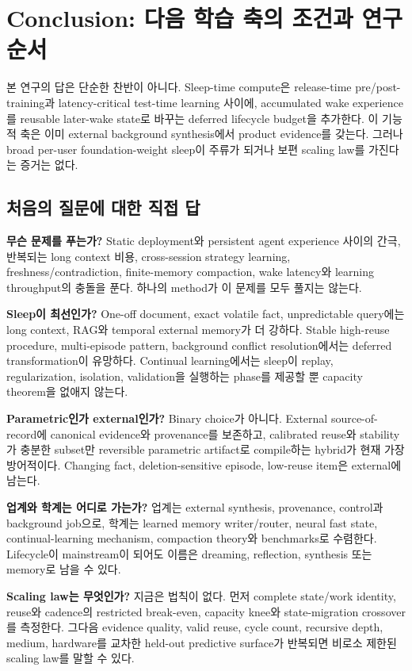 \chapter{Conclusion: 다음 학습 축의 조건과 연구 순서}
\label{STC-S17}

본 연구의 답은 단순한 찬반이 아니다. Sleep-time compute은 release-time pre/post-training과
latency-critical test-time learning 사이에, accumulated wake experience를 reusable later-wake state로
바꾸는 deferred lifecycle budget을 추가한다. 이 기능적 축은 이미 external background synthesis에서
product evidence를 갖는다. 그러나 broad per-user foundation-weight sleep이 주류가 되거나 보편 scaling
law를 가진다는 증거는 없다.

\section{처음의 질문에 대한 직접 답}

\textbf{무슨 문제를 푸는가?} Static deployment와 persistent agent experience 사이의 간극, 반복되는 long
context 비용, cross-session strategy learning, freshness/contradiction, finite-memory compaction, wake latency와
learning throughput의 충돌을 푼다. 하나의 method가 이 문제를 모두 풀지는 않는다.

\textbf{Sleep이 최선인가?} One-off document, exact volatile fact, unpredictable query에는 long context,
RAG와 temporal external memory가 더 강하다. Stable high-reuse procedure, multi-episode pattern,
background conflict resolution에서는 deferred transformation이 유망하다. Continual learning에서는 sleep이
replay, regularization, isolation, validation을 실행하는 phase를 제공할 뿐 capacity theorem을 없애지 않는다.

\textbf{Parametric인가 external인가?} Binary choice가 아니다. External source-of-record에 canonical
evidence와 provenance를 보존하고, calibrated reuse와 stability가 충분한 subset만 reversible parametric
artifact로 compile하는 hybrid가 현재 가장 방어적이다. Changing fact, deletion-sensitive episode,
low-reuse item은 external에 남는다.

\textbf{업계와 학계는 어디로 가는가?} 업계는 external synthesis, provenance, control과 background job으로,
학계는 learned memory writer/router, neural fast state, continual-learning mechanism, compaction theory와
benchmarks로 수렴한다. Lifecycle이 mainstream이 되어도 이름은 dreaming, reflection, synthesis 또는
memory로 남을 수 있다.

\textbf{Scaling law는 무엇인가?} 지금은 법칙이 없다. 먼저 complete state/work identity, reuse와 cadence의
restricted break-even, capacity knee와 state-migration crossover를 측정한다. 그다음 evidence quality,
valid reuse, cycle count, recursive depth, medium, hardware를 교차한 held-out predictive surface가 반복되면
비로소 제한된 scaling law를 말할 수 있다.

